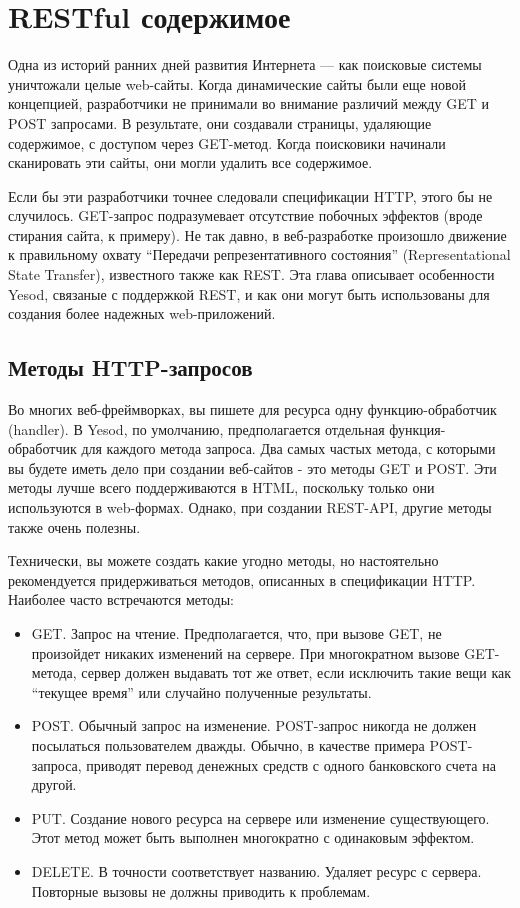 \chapter{RESTful содержимое}

Одна из историй ранних дней развития Интернета --- как поисковые системы уничтожали целые web-сайты. Когда динамические сайты были еще новой концепцией, разработчики не принимали во внимание различий между GET и POST запросами. В результате, они создавали страницы, удаляющие содержимое, с доступом через GET-метод. Когда поисковики начинали сканировать эти сайты, они могли удалить все содержимое.

Если бы эти разработчики точнее следовали спецификации HTTP, этого бы не случилось. GET-запрос подразумевает отсутствие побочных эффектов (вроде стирания сайта, к примеру). Не так давно, в веб-разработке произошло движение к правильному охвату “Передачи репрезентативного состояния” (Representational State Transfer), известного также как REST. Эта глава описывает особенности Yesod, связаные с поддержкой REST, и как они могут быть использованы для создания более надежных web-приложений.

\section{Методы HTTP-запросов}

Во многих веб-фреймворках, вы пишете для ресурса одну функцию-обработчик (handler). В Yesod, по умолчанию, предполагается отдельная функция-обработчик для каждого метода запроса. Два самых частых метода, с которыми вы будете иметь дело при создании веб-сайтов - это методы GET и POST. Эти методы лучше всего поддерживаются в HTML, поскольку только они используются в web-формах. Однако, при создании REST-API, другие методы также очень полезны.

Технически, вы можете создать какие угодно методы, но настоятельно рекомендуется придерживаться методов, описанных в спецификации HTTP. Наиболее часто встречаются методы:
\begin{itemize}
 \item GET. Запрос на чтение. Предполагается, что, при вызове GET, не произойдет никаких изменений на сервере. При многократном вызове GET-метода, сервер должен выдавать тот же ответ, если исключить такие вещи как “текущее время” или случайно полученные результаты. 
 \item POST. Обычный запрос на изменение. POST-запрос никогда не должен посылаться пользователем дважды. Обычно, в качестве примера POST-запроса, приводят перевод денежных средств с одного банковского счета на другой.
 \item PUT. Создание нового ресурса на сервере или изменение существующего. Этот метод может быть выполнен многократно с одинаковым эффектом.
 \item DELETE. В точности соответствует названию. Удаляет ресурс с сервера. Повторные вызовы не должны приводить к проблемам.
\end{itemize}

